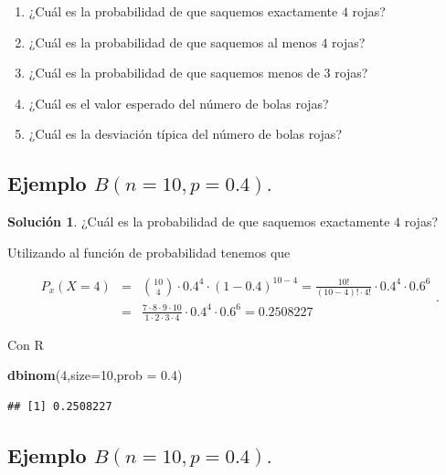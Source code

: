 \documentclass[]{book}
\newenvironment{Shaded}{\begin{snugshade}}{\end{snugshade}}
\newcommand{\DataTypeTok}[1]{\textcolor[rgb]{0.13,0.29,0.53}{#1}}
\newcommand{\DecValTok}[1]{\textcolor[rgb]{0.00,0.00,0.81}{#1}}
\newcommand{\FloatTok}[1]{\textcolor[rgb]{0.00,0.00,0.81}{#1}}
\newcommand{\KeywordTok}[1]{\textcolor[rgb]{0.13,0.29,0.53}{\textbf{#1}}}
\newcommand{\NormalTok}[1]{#1}
\providecommand{\tightlist}{%
  \setlength{\itemsep}{0pt}\setlength{\parskip}{0pt}}
\begin{document}
\begin{enumerate}
\def\labelenumi{\arabic{enumi}.}
\tightlist
\item
  ¿Cuál es la probabilidad de que saquemos exactamente \(4\) rojas?
\item
  ¿Cuál es la probabilidad de que saquemos al menos \(4\) rojas?
\item
  ¿Cuál es la probabilidad de que saquemos menos de \(3\) rojas?
\item
  ¿Cuál es el valor esperado del número de bolas rojas?
\item
  ¿Cuál es la desviación típica del número de bolas rojas?
\end{enumerate}

\hypertarget{ejemplo-bn10p0.4.-1}{%
\subsection{\texorpdfstring{Ejemplo \(B(n=10,p=0.4).\)}{Ejemplo B(n=10,p=0.4).}}\label{ejemplo-bn10p0.4.-1}}

\textbf{Solución 1}. ¿Cuál es la probabilidad de que saquemos exactamente \(4\) rojas?

Utilizando al función de probabilidad tenemos que

\[
\begin{eqnarray*}
P_x(X=4)&=&{10\choose 4}\cdot 0.4^4\cdot (1-0.4)^{10-4}
= \frac{10!}{(10-4)!\cdot 4!}\cdot 0.4^4\cdot 0.6^6\\
&=& \frac{7\cdot 8\cdot 9\cdot 10}{1\cdot 2\cdot 3\cdot 4}\cdot 0.4^4\cdot 0.6^6=0.2508227
\end{eqnarray*}
.
\]

Con R

\begin{Shaded}
\begin{Highlighting}[]
\KeywordTok{dbinom}\NormalTok{(}\DecValTok{4}\NormalTok{,}\DataTypeTok{size=}\DecValTok{10}\NormalTok{,}\DataTypeTok{prob =} \FloatTok{0.4}\NormalTok{)}
\end{Highlighting}
\end{Shaded}

\begin{verbatim}
## [1] 0.2508227
\end{verbatim}

\hypertarget{ejemplo-bn10p0.4.-2}{%
\subsection{\texorpdfstring{Ejemplo \(B(n=10,p=0.4).\)}{Ejemplo B(n=10,p=0.4).}}\label{ejemplo-bn10p0.4.-2}}
\end{document}
